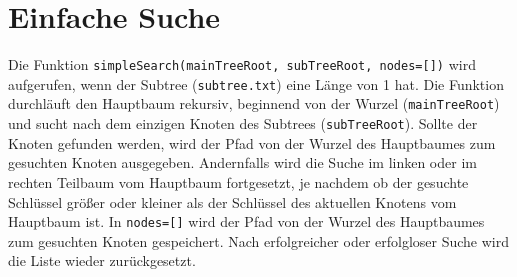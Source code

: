\documentclass{article}
\begin{document}
\section*{Einfache Suche}
Die Funktion \texttt{simpleSearch(mainTreeRoot, subTreeRoot, nodes=[])} wird aufgerufen, wenn der Subtree (\texttt{subtree.txt}) eine Länge von 1 hat. Die Funktion durchläuft den Hauptbaum rekursiv, beginnend von der Wurzel
(\texttt{mainTreeRoot}) und sucht nach dem einzigen Knoten des Subtrees (\texttt{subTreeRoot}). Sollte der Knoten gefunden werden, wird der Pfad von der Wurzel des Hauptbaumes zum gesuchten Knoten ausgegeben. Andernfalls wird die Suche im linken oder
im rechten Teilbaum vom Hauptbaum fortgesetzt, je nachdem ob der gesuchte Schlüssel größer oder kleiner als der Schlüssel des aktuellen Knotens vom Hauptbaum ist.
In \texttt{nodes=[]} wird der Pfad von der Wurzel des Hauptbaumes zum gesuchten Knoten gespeichert. Nach erfolgreicher oder erfolgloser Suche wird die Liste wieder zurückgesetzt.
\end{document}
